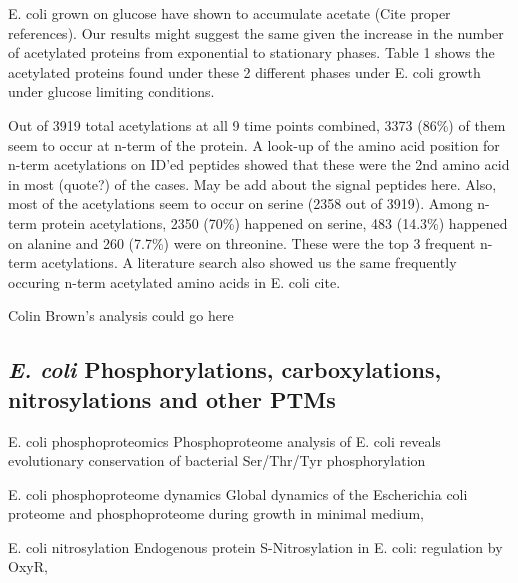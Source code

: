 \documentclass[12pt]{article}
\begin{document}
E. coli grown on glucose have shown to accumulate acetate (Cite proper references). Our results might suggest the same given the increase in the number of acetylated proteins from exponential to stationary phases. Table 1 shows the acetylated proteins found under these 2 different phases under E. coli growth under glucose limiting conditions.


Out of 3919 total acetylations at all 9 time points combined, 3373 (86\%) of them seem to occur at n-term of the protein. A look-up of the amino acid position for n-term acetylations on ID'ed peptides showed that these were the 2nd amino acid in most (quote?) of the cases. {May be add about the signal peptides here}. Also, most of the acetylations seem to occur on serine (2358 out of 3919). Among n-term protein acetylations, 2350 (70\%) happened on serine, 483 (14.3\%) happened on alanine and 260 (7.7\%) were on threonine. These were the top 3 frequent n-term acetylations. A literature search also showed us the same frequently occuring n-term acetylated amino acids in E. coli {cite}.

{Colin Brown's analysis could go here}

\subsection{\emph{E. coli} Phosphorylations, carboxylations, nitrosylations and other PTMs}

E. coli phosphoproteomics \cite{Maceketal2008}
{Phosphoproteome analysis of E. coli reveals evolutionary conservation of bacterial Ser/Thr/Tyr phosphorylation}

E. coli phosphoproteome dynamics \cite{Soaresetal2013}
{Global dynamics of the Escherichia coli proteome and phosphoproteome during growth in minimal medium},

E. coli nitrosylation \cite{Sethetal2012}
{Endogenous protein S-Nitrosylation in E. coli: regulation by OxyR},
\end{document}
